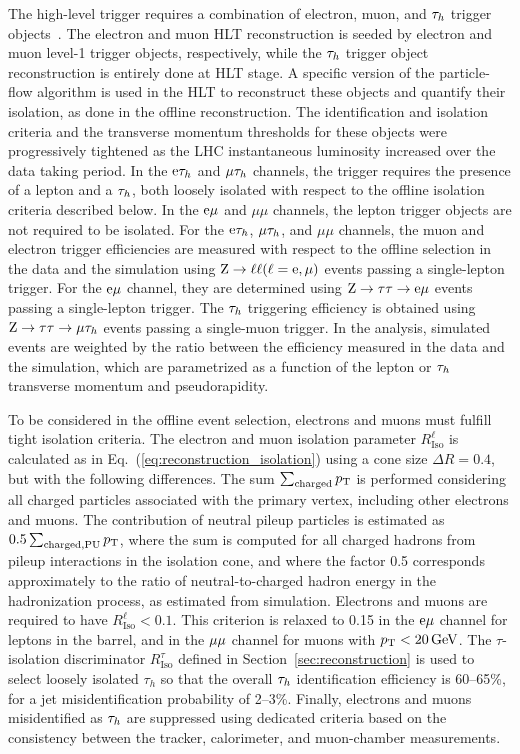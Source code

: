 \documentclass[11pt,twoside,a4paper,cmspaper,final,collab]{cms-tdr}
\begin{document}
The high-level trigger requires a combination of electron, muon, and $\tau_h$ trigger objects~\cite{CMS-PAS-EGM-10-004,CMS-PAS-MUO-10-002,CMS-EWK-TAU}.
The electron and muon HLT reconstruction is seeded by electron and muon level-1 trigger objects, respectively,
while the $\tau_h$ trigger object reconstruction is entirely done at HLT stage.
A specific version of the particle-flow algorithm is used in the HLT to reconstruct these objects and quantify their isolation, as done in the offline reconstruction.
The identification and isolation criteria and the transverse momentum
thresholds for these objects were progressively
tightened as the LHC instantaneous luminosity increased over the data taking period.
In the $\mathrm{e}\tau_h$ and ${\mu}\tau_h$ channels, the trigger requires the presence of a lepton and a $\tau_h$,
both loosely isolated with respect to the offline isolation criteria described below.
In the $\mathrm{e}\mu$ and $\mu\mu$ channels, the lepton trigger objects are not required to be isolated.
For the $\mathrm{e}\tau_h$, ${\mu}\tau_h$, and $\mu\mu$ channels, the muon and electron trigger efficiencies
are measured with respect to the offline selection  in the data and the simulation using $\mathrm{Z}\to \ell\ell (\ell=\mathrm{e},{\mu})$ events passing a single-lepton trigger.
For the $\mathrm{e}\mu$ channel, they are determined using $\mathrm{Z} \to \tau\tau \to \mathrm{e} \mu $ events passing a single-lepton trigger.
The $\tau_h$ triggering efficiency is obtained using $\mathrm{Z} \to \tau\tau \to \mu \tau_h$ events passing a single-muon trigger.
In the analysis, simulated events are weighted by the ratio between the efficiency measured in the data and the simulation,
which are parametrized as a function of the lepton or $\tau_h$ transverse momentum and pseudorapidity.

To be considered in the offline event selection, electrons and muons must fulfill tight isolation criteria.
The electron and muon isolation parameter $R_\text{Iso}^{\ell}$ is calculated as in Eq.~(\ref{eq:reconstruction_isolation}) using a cone size $\Delta R=0.4$, but with the following differences.
The sum $\sum_\text{charged}  p_{\mathrm{T}}$ is performed considering all charged particles associated with the primary vertex, including other electrons and muons.
The contribution of neutral  pileup particles is estimated as $0.5 \sum_{\rm charged, PU} p_{\mathrm{T}}$,
where the sum is computed for all charged hadrons from pileup interactions in the isolation cone,
and where the factor 0.5 corresponds approximately to the ratio of neutral-to-charged
hadron energy in the hadronization process, as estimated from simulation.
Electrons and muons are required to have $R_\text{Iso}^{\ell}<0.1$.
This criterion is relaxed to 0.15 in the $\mathrm{e}{\mu}$ channel for leptons in the barrel,
and in the ${\mu}{\mu}$ channel for muons with $p_{\mathrm{T}}<20\,\text{Ge\hspace{-.08em}V}$.
The $\tau$-isolation discriminator $R_\text{Iso}^{\tau}$ defined in Section~\ref{sec:reconstruction} is used to select loosely isolated $\tau_h$
so that the overall $\tau_h$ identification efficiency is 60--65\%,
for a jet misidentification probability of 2--3\%.
Finally, electrons and muons misidentified as $\tau_h$ are suppressed
using dedicated criteria based on the consistency between the tracker, calorimeter, and muon-chamber measurements.
\end{document}
